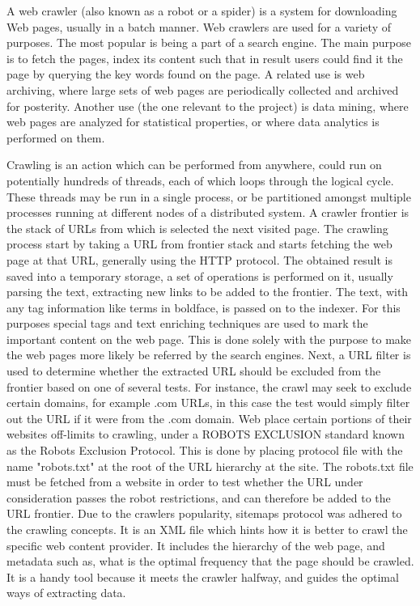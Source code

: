 A web crawler (also known as a robot or a spider) is a system for downloading Web pages, usually in a batch manner. Web crawlers are used for a variety of
purposes. The most popular is being a part of a search engine. The main purpose is to fetch the pages, index its content such that in result users could find it the page by querying the key words found on the page. A related use is web archiving, where large sets of web pages are periodically collected and archived for posterity. Another use (the one relevant to the project) is data mining, where web pages are analyzed for statistical properties, or where data analytics is performed on them.

Crawling is an action which can be performed from anywhere, could run on potentially hundreds of threads, each of which loops through the logical cycle. These threads may be run in a single process, or be partitioned amongst multiple processes running at different nodes of a distributed system. A crawler frontier is the stack of URLs from which is selected the next visited page. The crawling process start by taking a URL from frontier stack and starts fetching the web page at that URL, generally using the HTTP protocol. The obtained result is saved into a temporary storage, a set of operations is performed on it, usually parsing the text, extracting new links to be added to the frontier. The text, with any tag information like terms in
boldface, is passed on to the indexer. For this purposes special tags and text enriching techniques are used to mark the important content on the web page. This is done solely with the purpose to make the web pages more likely be referred by the search engines. Next, a URL filter is used to determine whether the extracted URL should be excluded from the frontier based on one of several tests. For instance, the crawl may seek to exclude certain domains, for example .com  URLs, in this case the test would simply filter out the URL if it were from the .com domain. Web place certain portions of their websites off-limits to crawling, under a ROBOTS EXCLUSION standard known as the Robots Exclusion Protocol. This is done by placing protocol file with the name "robots.txt" at the root of the URL hierarchy at the site. The robots.txt file must be fetched from a website in order to test whether the URL under consideration passes the robot restrictions, and can therefore be added to the URL frontier. Due to the crawlers popularity, sitemaps protocol was adhered to the crawling concepts. It is an XML file which hints how it is better to crawl the specific web content provider. It includes the hierarchy of the web page, and metadata such as, what is the optimal frequency that the page should be crawled. It is a handy tool because it meets the crawler halfway, and guides the optimal ways of extracting data.

